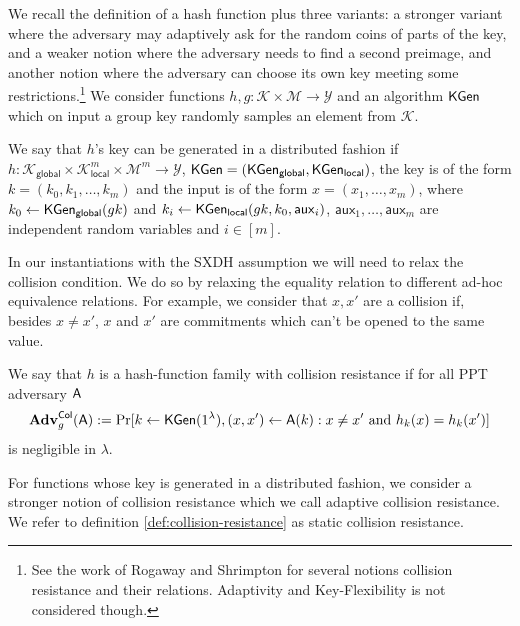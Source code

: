 
We recall the definition of a hash function plus three variants: a stronger variant where  the adversary may adaptively ask for the random coins of parts of the key, and a weaker notion where the adversary needs to find a second preimage, and another notion where the adversary can choose its own key meeting some restrictions.\footnote{See the work of Rogaway and Shrimpton \cite{FSE:RogShr04} for several notions collision resistance and their relations. Adaptivity and Key-Flexibility is not considered though.} We consider functions $h,g:\mathcal{K}\times\mathcal{M}\to\mathcal{Y}$ and an algorithm $\mathsf{KGen}$ which on input a group key randomly samples an element from $\mathcal{K}$.

We say that $h$'s key can be generated in a distributed fashion if $h:\mathcal{K}_\mathsf{global}\times\mathcal{K}^m_{\mathsf{local}}\times\mathcal{M}^m\to \mathcal{Y}$, $\mathsf{KGen} = (\mathsf{KGen}_\mathsf{global},\mathsf{KGen}_\mathsf{local})$, the key is of the form $k = (k_0,k_1,\ldots,k_m)$ and the input is of the form $x=(x_1,\ldots,x_m)$, where $k_0\gets\mathsf{KGen}_{\mathsf{global}}(gk)$ and $k_i\gets\mathsf{KGen}_{\mathsf{local}}(gk,k_0,\mathsf{aux}_i)$, $\mathsf{aux}_1,\ldots,\mathsf{aux}_m$ are independent random variables and $i\in[m]$. 

In our instantiations with the SXDH assumption we will need to relax the collision condition. We do so by relaxing the equality relation to different ad-hoc equivalence relations. For example, we consider that $x,x'$ are a collision if, besides $x\neq x'$, $x$ and $x'$ are commitments which can't be opened to the same value.

\begin{definition}\label{def:hash1}
 We say that $h$ is a hash-function family with collision resistance if for all PPT adversary $\mathsf{A}$
$$
\mathbf{Adv}_g^{\mathsf{Col}}(\mathsf{A}) := \Pr[k\gets\mathsf{KGen}(1^\lambda), (x,x')\gets \mathsf{A}(k):x\neq x'\text{ and }h_k(x)=h_k(x')]
$$ 
is negligible in $\lambda$.
\label{def:collision-resistance}
\end{definition}

For functions whose key is generated in a distributed fashion, we consider a stronger notion of collision resistance which we call adaptive collision resistance. We refer to definition \ref{def:collision-resistance} as static collision resistance.


